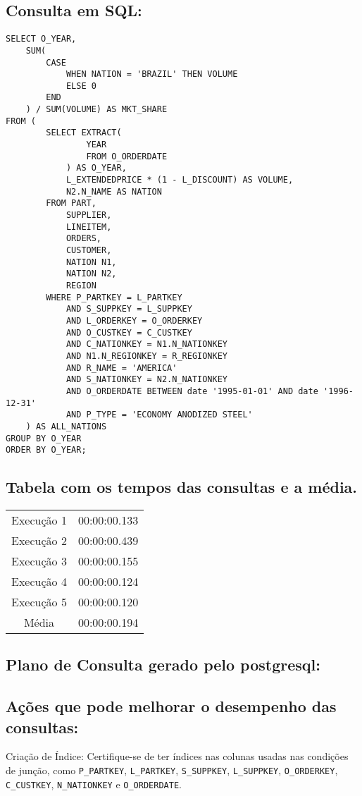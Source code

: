 \documentclass[12pt]{article}
\begin{document}
\begin{landscape}
\subsection{Consulta em SQL:}
\begin{lstlisting}
SELECT O_YEAR,
	SUM(
		CASE
			WHEN NATION = 'BRAZIL' THEN VOLUME
			ELSE 0
		END
	) / SUM(VOLUME) AS MKT_SHARE
FROM (
		SELECT EXTRACT(
				YEAR
				FROM O_ORDERDATE
			) AS O_YEAR,
			L_EXTENDEDPRICE * (1 - L_DISCOUNT) AS VOLUME,
			N2.N_NAME AS NATION
		FROM PART,
			SUPPLIER,
			LINEITEM,
			ORDERS,
			CUSTOMER,
			NATION N1,
			NATION N2,
			REGION
		WHERE P_PARTKEY = L_PARTKEY
			AND S_SUPPKEY = L_SUPPKEY
			AND L_ORDERKEY = O_ORDERKEY
			AND O_CUSTKEY = C_CUSTKEY
			AND C_NATIONKEY = N1.N_NATIONKEY
			AND N1.N_REGIONKEY = R_REGIONKEY
			AND R_NAME = 'AMERICA'
			AND S_NATIONKEY = N2.N_NATIONKEY
			AND O_ORDERDATE BETWEEN date '1995-01-01' AND date '1996-12-31'
			AND P_TYPE = 'ECONOMY ANODIZED STEEL'
	) AS ALL_NATIONS
GROUP BY O_YEAR
ORDER BY O_YEAR;
\end{lstlisting}

\subsection{Tabela com os tempos das consultas e a média.}
\begin{tabular}{|c|c|}
  \hline
  Execução 1 & 00:00:00.133 \\
  Execução 2 & 00:00:00.439 \\
  Execução 3 & 00:00:00.155 \\
  Execução 4 & 00:00:00.124 \\
  Execução 5 & 00:00:00.120 \\
  \hline
  Média & 00:00:00.194 \\
  \hline
\end{tabular}

\subsection{Plano de Consulta gerado pelo postgresql:}

\subsection{Ações que pode melhorar o desempenho das 
consultas:} Criação de Índice: Certifique-se de ter índices nas colunas usadas nas condições de junção, como \texttt{P\_PARTKEY}, \texttt{L\_PARTKEY}, \texttt{S\_SUPPKEY}, \texttt{L\_SUPPKEY}, \texttt{O\_ORDERKEY}, \texttt{C\_CUSTKEY}, \texttt{N\_NATIONKEY} e \texttt{O\_ORDERDATE}.


\end{landscape}
\end{document}
